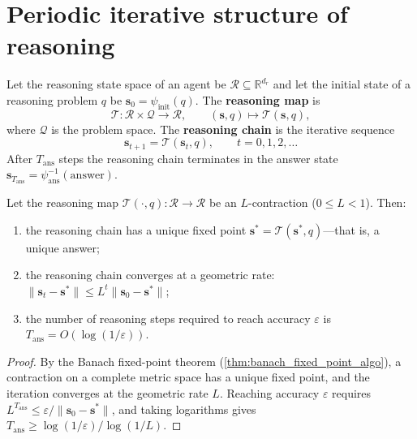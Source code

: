 \section{Periodic iterative structure of reasoning}
\label{sec:reasoning_periodicity}

\begin{definition}\label{def:reasoning_chain}
Let the reasoning state space of an agent be $\mathcal{R}\subseteq\mathbb{R}^{d_r}$ and let the initial state of a reasoning problem $q$ be $\mathbf{s}_0=\psi_{\text{init}}(q)$. The \textbf{reasoning map} is
\[
\mathcal{T}:\mathcal{R}\times\mathcal{Q}\to\mathcal{R},\qquad
(\mathbf{s},q)\mapsto\mathcal{T}(\mathbf{s},q),
\]
where $\mathcal{Q}$ is the problem space. The \textbf{reasoning chain} is the iterative sequence
\[
\mathbf{s}_{t+1}=\mathcal{T}(\mathbf{s}_t,q),\qquad t=0,1,2,\dots
\]
After $T_{\text{ans}}$ steps the reasoning chain terminates in the answer state $\mathbf{s}_{T_{\text{ans}}}=\psi_{\text{ans}}^{-1}(\text{answer})$.
\end{definition}

\begin{theorem}\label{thm:reasoning_fixed_point}
Let the reasoning map $\mathcal{T}(\cdot,q):\mathcal{R}\to\mathcal{R}$ be an $L$-contraction ($0\le L<1$). Then:
\begin{enumerate}[label=(\roman*)]
    \item the reasoning chain has a unique fixed point $\mathbf{s}^*=\mathcal{T}(\mathbf{s}^*,q)$---that is, a unique answer;
    \item the reasoning chain converges at a geometric rate: $\|\mathbf{s}_t-\mathbf{s}^*\|\le L^t\|\mathbf{s}_0-\mathbf{s}^*\|$;
    \item the number of reasoning steps required to reach accuracy $\varepsilon$ is $T_{\text{ans}}=O(\log(1/\varepsilon))$.
\end{enumerate}
\end{theorem}

\begin{proof}
By the Banach fixed-point theorem (\cref{thm:banach_fixed_point_algo}), a contraction on a complete metric space has a unique fixed point, and the iteration converges at the geometric rate $L$. Reaching accuracy $\varepsilon$ requires $L^{T_{\text{ans}}}\le\varepsilon/\|\mathbf{s}_0-\mathbf{s}^*\|$, and taking logarithms gives $T_{\text{ans}}\ge\log(1/\varepsilon)/\log(1/L)$.
\end{proof}


